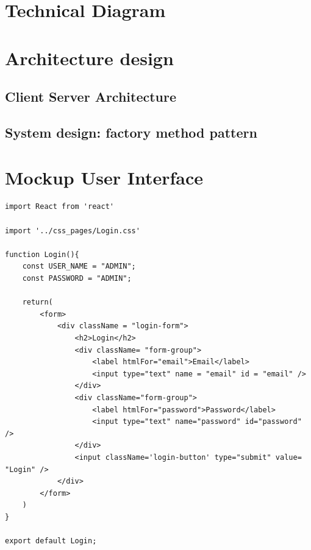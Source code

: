 \documentclass[a4paper, 13pt]{article}
\theoremstyle{definition}
\begin{document}
\section{Technical Diagram}
\section{Architecture design}
\subsection{Client Server Architecture}
\subsection{System design: factory method pattern}
\section{Mockup User Interface}
    \begin{lstlisting}
import React from 'react'

import '../css_pages/Login.css'

function Login(){
    const USER_NAME = "ADMIN";
    const PASSWORD = "ADMIN";
    
    return(
        <form>
            <div className = "login-form">
                <h2>Login</h2>
                <div className= "form-group">
                    <label htmlFor="email">Email</label>
                    <input type="text" name = "email" id = "email" />
                </div>
                <div className="form-group">
                    <label htmlFor="password">Password</label>
                    <input type="text" name="password" id="password" />
                </div>
                <input className='login-button' type="submit" value= "Login" />
            </div>
        </form>
    )
}

export default Login;
    \end{lstlisting}
\end{document}
